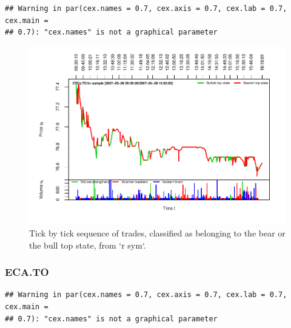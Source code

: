 \documentclass[]{article}
\begin{document}
\begin{verbatim}
## Warning in par(cex.names = 0.7, cex.axis = 0.7, cex.lab = 0.7, cex.main =
## 0.7): "cex.names" is not a graphical parameter
\end{verbatim}

\begin{figure}[H]
\includegraphics[width=\textwidth]{main_files/figure-latex/unnamed-chunk-30-1} \caption{Tick by tick sequence of trades, classified as belonging to the bear or the bull top state, from `r sym`.}\label{fig:unnamed-chunk-30}
\end{figure}

\newpage

\subsubsection{ECA.TO}\label{eca.to}

\begin{verbatim}
## Warning in par(cex.names = 0.7, cex.axis = 0.7, cex.lab = 0.7, cex.main =
## 0.7): "cex.names" is not a graphical parameter
\end{verbatim}
\end{document}
